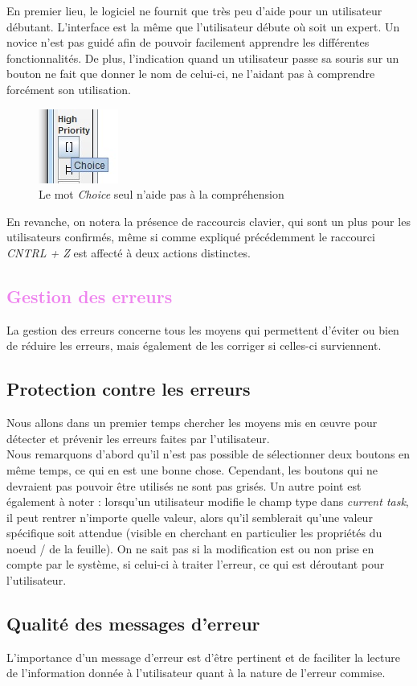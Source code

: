 \documentclass[12pt, a4paper]{article}
\begin{document}
En premier lieu, le logiciel ne fournit que très peu d'aide pour un utilisateur débutant. L'interface est la même que l'utilisateur débute où soit un expert. Un novice n'est pas guidé afin de pouvoir facilement apprendre les différentes fonctionnalités. De plus, l'indication quand un utilisateur passe sa souris sur un bouton ne fait que donner le nom de celui-ci, ne l'aidant pas à comprendre forcément son utilisation.
\begin{figure}[h]
\begin{center}
   \includegraphics[scale = 1]{imagebtn.jpg}
	\caption{Le mot \emph{Choice} seul n'aide pas à la compréhension}
	\end{center}
\end{figure}

En revanche, on notera la présence de raccourcis clavier, qui sont un plus pour les utilisateurs confirmés, même si comme expliqué précédemment le raccourci \emph{CNTRL + Z} est affecté à deux actions distinctes.

\textcolor{Violet}{\section{Gestion des erreurs}}
La gestion des erreurs concerne tous les moyens qui permettent d'éviter ou bien de réduire les erreurs, mais également de les corriger si celles-ci surviennent.

\textcolor{NavyBlue}{\subsection{Protection contre les erreurs}}
Nous allons dans un premier temps chercher les moyens mis en œuvre pour détecter et prévenir les erreurs faites par l'utilisateur. \\


Nous remarquons d'abord qu'il n'est pas possible de sélectionner deux boutons en même temps, ce qui en est une bonne chose. Cependant, les boutons qui ne devraient pas pouvoir être utilisés ne sont pas grisés. Un autre point est également à noter : lorsqu'un utilisateur modifie le champ type dans \emph{current task}, il peut rentrer n'importe quelle valeur, alors qu'il semblerait qu'une valeur spécifique soit attendue (visible en cherchant en particulier les propriétés du noeud / de la feuille). On ne sait pas si la modification est ou non prise en compte par le système, si celui-ci à traiter l'erreur, ce qui est déroutant pour l'utilisateur.
\newpage
\textcolor{NavyBlue}{\subsection{Qualité des messages d'erreur}}
L'importance d'un message d'erreur est d'être pertinent et de faciliter la lecture de l'information donnée à l'utilisateur quant à la nature de l'erreur commise.\\
\end{document}
